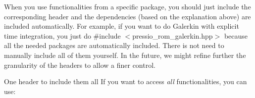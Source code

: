 \begin{DoxyParagraph}{}
When you use functionalities from a specific package, you should just include the corresponding header and the dependencies (based on the explanation above) are included automatically. For example, if you want to do Galerkin with explicit time integration, you just do {\ttfamily \#include $<$pressio\+\_\+rom\+\_\+galerkin.\+hpp$>$} because all the needed packages are automatically included. There is not need to manually include all of them yourself. In the future, we might refine further the granularity of the headers to allow a finer control.
\end{DoxyParagraph}


\begin{DoxyParagraph}{One header to include them all}
If you want to access {\itshape all} functionalities, you can use\+: 
\begin{DoxyCode}{0}

\end{DoxyCode}
 
\end{DoxyParagraph}
